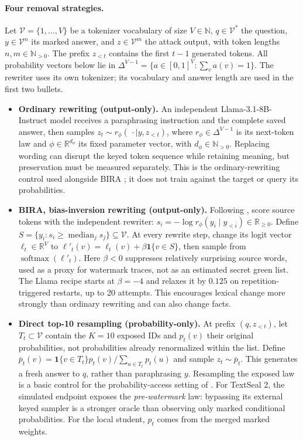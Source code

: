 \paragraph{Four removal strategies.} Let $\mathcal V=\{1,\ldots,V\}$ be a tokenizer vocabulary of size $V\in\mathbb N$, $q\in\mathcal V^*$ the question, $y\in\mathcal V^n$ its marked answer, and $z\in\mathcal V^m$ the attack output, with token lengths $n,m\in\mathbb N_{>0}$. The prefix $z_{<t}$ contains the first $t-1$ generated tokens. All probability vectors below lie in $\Delta^{V-1}=\{a\in[0,1]^V:\sum_v a(v)=1\}$. The rewriter uses its own tokenizer; its vocabulary and answer length are used in the first two bullets.
\begin{itemize}
\item \textbf{Ordinary rewriting (output-only).} An independent Llama-3.1-8B-Instruct model receives a paraphrasing instruction and the complete saved answer, then samples
$z_t\sim r_\phi(\,\cdot\mid y,z_{<t})$, where $r_\phi\in\Delta^{V-1}$ is its next-token law and $\phi\in\mathbb R^{d_\phi}$ its fixed parameter vector, with $d_\phi\in\mathbb N_{>0}$. Replacing wording can disrupt the keyed token sequence while retaining meaning, but preservation must be measured separately. This is the ordinary-rewriting control used alongside BIRA \citep{hwang2026bira}; it does not train against the target or query its probabilities.
\item \textbf{BIRA, bias-inversion rewriting (output-only).} Following \citet{hwang2026bira}, score source tokens with the independent rewriter: $s_i=-\log r_\phi(y_i\mid y_{<i})\in\mathbb R_{\geq0}$. Define $S=\{y_i:s_i\geq\operatorname{median}_j s_j\}\subseteq\mathcal V$. At every rewrite step, change its logit vector $\ell_t\in\mathbb R^V$ to $\ell'_t(v)=\ell_t(v)+\beta\mathbf1\{v\in S\}$, then sample from $\operatorname{softmax}(\ell'_t)$. Here $\beta<0$ suppresses relatively surprising source words, used as a proxy for watermark traces, not as an estimated secret green list. The Llama recipe starts at $\beta=-4$ and relaxes it by $0.125$ on repetition-triggered restarts, up to 20 attempts. This encourages lexical change more strongly than ordinary rewriting and can also change facts.
\item \textbf{Direct top-10 resampling (probability-only).} At prefix $(q,z_{<t})$, let $T_t\subset\mathcal V$ contain the $K=10$ exposed IDs and $p_t(v)$ their original probabilities, not probabilities already renormalized within the list. Define $\bar p_t(v)=\mathbf1\{v\in T_t\}p_t(v)/\sum_{u\in T_t}p_t(u)$ and sample $z_t\sim\bar p_t$. This generates a fresh answer to $q$, rather than paraphrasing $y$. Resampling the exposed law is a basic control for the probability-access setting of \citet{chang2025smoothing}. For TextSeal 2, the simulated endpoint exposes the \emph{pre-watermark} law: bypassing its external keyed sampler is a stronger oracle than observing only marked conditional probabilities. For the local student, $p_t$ comes from the merged marked weights.

\end{itemize}
